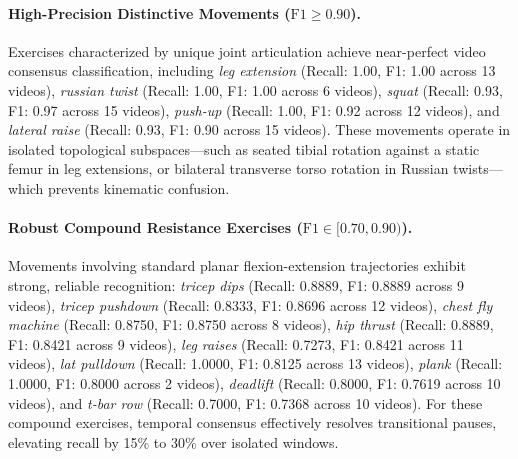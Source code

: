 \documentclass[preprint,12pt]{elsarticle}
\begin{document}
\paragraph{High-Precision Distinctive Movements ($\text{F1} \ge 0.90$).} Exercises characterized by unique joint articulation achieve near-perfect video consensus classification, including \textit{leg extension} (Recall: 1.00, F1: 1.00 across 13 videos), \textit{russian twist} (Recall: 1.00, F1: 1.00 across 6 videos), \textit{squat} (Recall: 0.93, F1: 0.97 across 15 videos), \textit{push-up} (Recall: 1.00, F1: 0.92 across 12 videos), and \textit{lateral raise} (Recall: 0.93, F1: 0.90 across 15 videos). These movements operate in isolated topological subspaces---such as seated tibial rotation against a static femur in leg extensions, or bilateral transverse torso rotation in Russian twists---which prevents kinematic confusion.

\paragraph{Robust Compound Resistance Exercises ($\text{F1} \in [0.70, 0.90)$).} Movements involving standard planar flexion-extension trajectories exhibit strong, reliable recognition: \textit{tricep dips} (Recall: 0.8889, F1: 0.8889 across 9 videos), \textit{tricep pushdown} (Recall: 0.8333, F1: 0.8696 across 12 videos), \textit{chest fly machine} (Recall: 0.8750, F1: 0.8750 across 8 videos), \textit{hip thrust} (Recall: 0.8889, F1: 0.8421 across 9 videos), \textit{leg raises} (Recall: 0.7273, F1: 0.8421 across 11 videos), \textit{lat pulldown} (Recall: 1.0000, F1: 0.8125 across 13 videos), \textit{plank} (Recall: 1.0000, F1: 0.8000 across 2 videos), \textit{deadlift} (Recall: 0.8000, F1: 0.7619 across 10 videos), and \textit{t-bar row} (Recall: 0.7000, F1: 0.7368 across 10 videos). For these compound exercises, temporal consensus effectively resolves transitional pauses, elevating recall by 15\% to 30\% over isolated windows.
\end{document}
